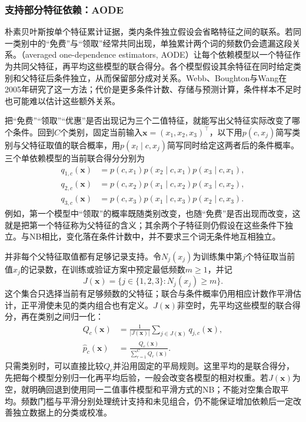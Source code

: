 \subsubsection{支持部分特征依赖：AODE}
\label{sec:classification-naive-bayes-dependence-extension}

朴素贝叶斯按单个特征累计证据，类内条件独立假设会省略特征之间的联系。若同一类别中的“免费”与“领取”经常共同出现，单独累计两个词的频数仍会遗漏这段关系。（averaged one-dependence estimators, AODE）让每个依赖模型以一个特征作为共同父特征，再平均这些模型的联合得分。各个模型假设其余特征在同时给定类别和父特征后条件独立，从而保留部分成对关系。Webb、Boughton与Wang在2005年研究了这一方法；代价是更多条件计数、存储与预测计算，条件样本不足时也可能难以估计这些额外关系。

把“免费”“领取”“优惠”是否出现记为三个二值特征，就能写出父特征实际改变了哪个条件。回到$C$个类别，固定当前输入$\bm x=(x_1,x_2,x_3)^\top$，以下用$p(c,x_j)$简写类别与父特征取值的联合概率，用$p(x_l\mid c,x_j)$简写同时给定这两者后的条件概率。三个单依赖模型的当前联合得分分别为
\[
  \begin{aligned}
    q_{1,c}(\bm x)
      &=p(c,x_1)p(x_2\mid c,x_1)p(x_3\mid c,x_1),\\
    q_{2,c}(\bm x)
      &=p(c,x_2)p(x_1\mid c,x_2)p(x_3\mid c,x_2),\\
    q_{3,c}(\bm x)
      &=p(c,x_3)p(x_1\mid c,x_3)p(x_2\mid c,x_3).
  \end{aligned}
\]
例如，第一个模型中“领取”的概率既随类别改变，也随“免费”是否出现而改变，这就是把第一个特征称为父特征的含义；其余两个子特征则仍假设在这些条件下独立。与NB相比，变化落在条件计数中，并不要求三个词无条件地互相独立。

并非每个父特征取值都有足够记录支持。令$N_j(x_j)$为训练集中第$j$个特征取当前值$x_j$的记录数，在训练或验证方案中预定最低频数$m\geq1$，并记
\[
  J(\bm x)=\{j\in\{1,2,3\}:N_j(x_j)\geq m\}.
\]
这个集合只选择当前有足够频数的父特征；联合与条件概率仍用相应计数作平滑估计，正平滑使未见的类内组合也有定义。$J(\bm x)$非空时，先平均这些模型的联合得分，再在类别之间归一化：
\begin{equation}
  \label{eq:classification-aode-joint-average}
  \begin{aligned}
    Q_c(\bm x)
      &=\frac{1}{|J(\bm x)|}
          \sum_{j\in J(\bm x)}q_{j,c}(\bm x),\\
    \hat p_c(\bm x)
      &=\frac{Q_c(\bm x)}{\sum_{r=1}^{C}Q_r(\bm x)}.
  \end{aligned}
\end{equation}
只需类别时，可以直接比较$Q_c$并沿用固定的平局规则。这里平均的是联合得分，先把每个模型分别归一化再平均后验，一般会改变各模型的相对权重。若$J(\bm x)$为空，就明确回退到使用同一二值事件模型和平滑方式的NB；不能对空集合取平均。频数门槛与平滑分别处理统计支持和未见组合，仍不能保证增加依赖后一定改善独立数据上的分类或校准。

